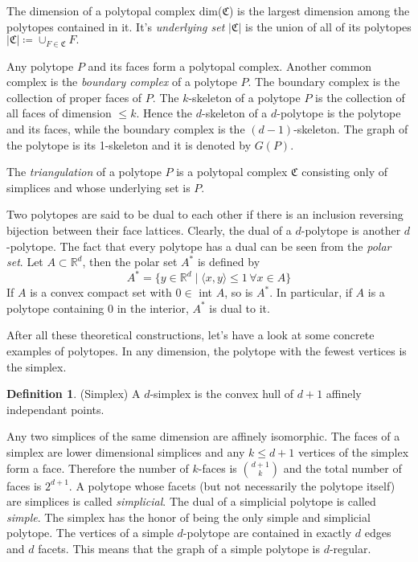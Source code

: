 \documentclass[a4paper,12pt]{book}
\theoremstyle{plain}
\theoremstyle{definition}
\newtheorem{definition}[theorem]{Definition}
\begin{document}
The dimension of a polytopal complex dim($\mathfrak{C}$) is the largest dimension
among the polytopes contained in it. It's \textit{underlying set} $|\mathfrak{C}|$ is the union of all of 
its polytopes $  |\mathfrak{C}| \coloneqq \cup_{F\in \mathfrak{C}} F.$

Any polytope $P$ and its faces form a polytopal complex. Another common complex is the 
\textit{boundary complex} of a polytope
$P$. The boundary complex is the collection of proper faces of $P$.
The $k$-skeleton of a polytope $P$ is the collection of all faces of dimension $\leq 
k$. Hence the $d$-skeleton of a $d$-polytope is the polytope and its faces, while the 
boundary complex is the $(d-1)$-skeleton. The graph of the polytope is its 
1-skeleton and it is denoted by $G(P)$.

The \textit{triangulation} of a polytope $P$ is a polytopal complex $\mathfrak{C}$ consisting only of simplices
and whose underlying set is $P$.



Two polytopes are said to be dual to each other if there is an inclusion 
reversing bijection between their face lattices. Clearly, the dual of a 
$d$-polytope is another $d$-polytope. The fact that every polytope has a dual 
can be seen from the \textit{polar set}. Let $A\subset \mathbb{R}^d$, then the 
polar set $A^*$ is defined by
\begin{equation}
 A^* = \{y \in \mathbb{R}^d \mid \langle x,y\rangle \leq 1 \, \forall  x  \in A 
\} 
\end{equation}
If $A$ is a convex compact set with $0 \in$ int $A$, so is $A^*$. In 
particular, if $A$ is a polytope containing $0$ in the interior, $A^*$ is dual 
to it. 

After all these theoretical constructions, let's have a look at some concrete examples
of polytopes.
In any dimension, the polytope with the fewest vertices is the simplex. 
\begin{definition}
 (Simplex) A $d$-simplex is the convex hull of $d+1$ affinely independant 
points.
\end{definition}
Any two simplices of the same dimension are affinely isomorphic.
The faces of a simplex are lower dimensional simplices and any $k\le d+1$ vertices
of the simplex form a face. Therefore the number of $k$-faces is $\binom{d+1}{k}$
and the total number of faces is $2^{d+1}$.
 A polytope whose facets 
(but not necessarily the polytope itself) are simplices is called 
\textit{simplicial}. The dual of a simplicial polytope is called 
\textit{simple}. The simplex has the honor of being the only simple and simplicial polytope.
The vertices of a simple $d$-polytope are contained in exactly 
$d$ edges and $d$ facets. This means that the graph of a simple polytope is $d$-regular.
\end{document}
